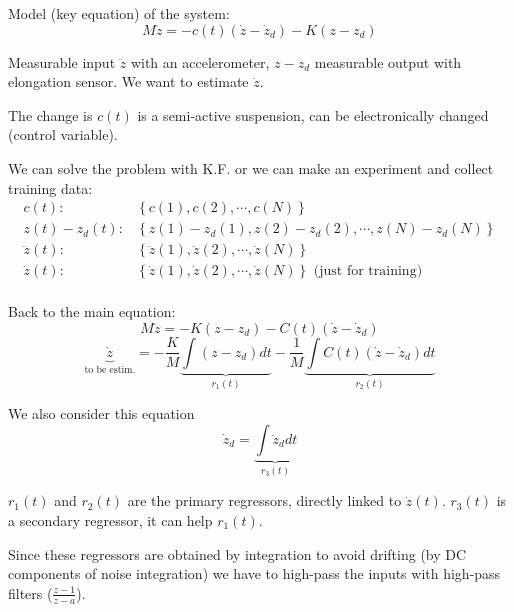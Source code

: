 \begin{exercise}
    Model (key equation) of the system:
    \[
        M\ddot{z} = -c(t)(\dot{z}-\dot{z}_d) - K(z-z_d)
    \]

    Measurable input $\ddot{z}$ with an accelerometer, $z-z_d$ measurable output with elongation sensor.
    We want to estimate $\dot{z}$.

    The change is $c(t)$ is a semi-active suspension, can be electronically changed (control variable).

    We can solve the problem with K.F. or we can make an experiment and collect training data:
    \begin{align*}
        c(t)        : & \left\{ c(1), c(2), \cdots, c(N) \right\} \\
        z(t)-z_d(t) : & \left\{ z(1)-z_d(1), z(2)-z_d(2), \cdots, z(N)-z_d(N) \right\} \\
        \ddot{z}(t) : & \left\{ \ddot{z}(1), \ddot{z}(2), \cdots, \ddot{z}(N) \right\} \\
        \dot{z}(t)  : & \left\{ \dot{z}(1), \dot{z}(2), \cdots, \dot{z}(N) \right\} \text{ (just for training)} \\
    \end{align*}


    Back to the main equation:
    \[
        M\ddot{z} = -K(z-z_d)-C(t)(\dot{z}-\dot{z}_d)
    \]
    \[
        \underbrace{\dot{z}}_{\text{to be estim.}} =
        -\frac{K}{M} \underbrace{\int (z-z_d)dt}_{r_1(t)}
        -\frac{1}{M} \underbrace{\int C(t)(\dot{z}-\dot{z}_d)dt}_{r_2(t)}
    \]

    We also consider this equation
    \[
        \dot{z}_d = \underbrace{\int \ddot{z}_d dt}_{r_3(t)}
    \]

    $r_1(t)$ and $r_2(t)$ are the primary regressors, directly linked to $\dot{z}(t)$. $r_3(t)$ is a secondary regressor, it can help $r_1(t)$.

    Since these regressors are obtained by integration to avoid drifting (by DC components of noise integration) we have to high-pass the inputs with high-pass filters ($\frac{z-1}{z-a}$).


\end{exercise}
